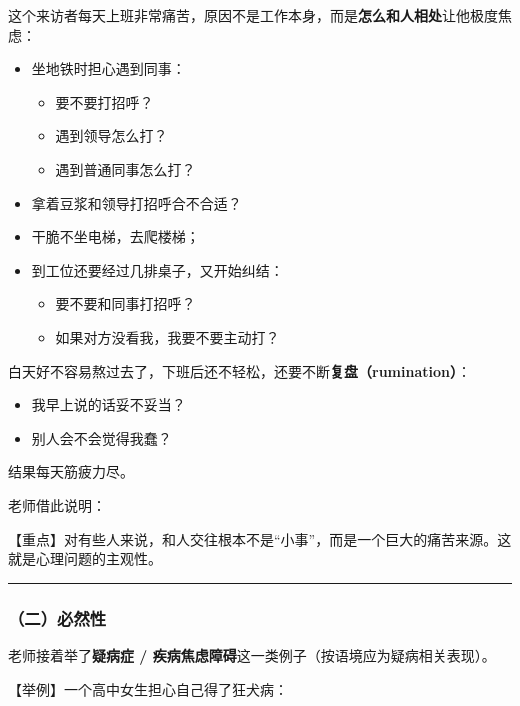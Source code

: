 \documentclass[
  chinese,
  9pt,
  a4paper,
]{ctexart}
\providecommand{\tightlist}{%
  \setlength{\itemsep}{0pt}\setlength{\parskip}{0pt}}
\begin{document}
这个来访者每天上班非常痛苦，原因不是工作本身，而是\textbf{怎么和人相处}让他极度焦虑：

\begin{itemize}
\item
  坐地铁时担心遇到同事：

  \begin{itemize}
  \tightlist
  \item
    要不要打招呼？
  \item
    遇到领导怎么打？
  \item
    遇到普通同事怎么打？
  \end{itemize}
\item
  拿着豆浆和领导打招呼合不合适？
\item
  干脆不坐电梯，去爬楼梯；
\item
  到工位还要经过几排桌子，又开始纠结：

  \begin{itemize}
  \tightlist
  \item
    要不要和同事打招呼？
  \item
    如果对方没看我，我要不要主动打？
  \end{itemize}
\end{itemize}

白天好不容易熬过去了，下班后还不轻松，还要不断\textbf{复盘（rumination）}：

\begin{itemize}
\tightlist
\item
  我早上说的话妥不妥当？
\item
  别人会不会觉得我蠢？
\end{itemize}

结果每天筋疲力尽。

老师借此说明：

【重点】对有些人来说，和人交往根本不是``小事''，而是一个巨大的痛苦来源。这就是心理问题的主观性。

\begin{center}\rule{0.5\linewidth}{0.5pt}\end{center}

\subsubsection{（二）必然性}\label{ux4e8cux5fc5ux7136ux6027}

老师接着举了\textbf{疑病症 /
疾病焦虑障碍}这一类例子（按语境应为疑病相关表现）。

【举例】一个高中女生担心自己得了狂犬病：
\end{document}

